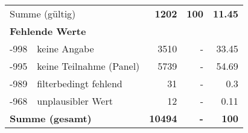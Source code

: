 \begin{longtable}{lXrrr}
     \midrule
     \multicolumn{2}{l}{Summe (gültig)} &
       \textbf{\num{1202}} &
     \textbf{100} &
       \textbf{\num[round-mode=places,round-precision=2]{11,45}} \\
     \multicolumn{5}{l}{\textbf{Fehlende Werte}}\\
       -998 &
       keine Angabe &
         \num{3510} &
        - &
         \num[round-mode=places,round-precision=2]{33,45} \\
       -995 &
       keine Teilnahme (Panel) &
         \num{5739} &
        - &
         \num[round-mode=places,round-precision=2]{54,69} \\
       -989 &
       filterbedingt fehlend &
         \num{31} &
        - &
         \num[round-mode=places,round-precision=2]{0,3} \\
       -968 &
       unplausibler Wert &
         \num{12} &
        - &
         \num[round-mode=places,round-precision=2]{0,11} \\
     \midrule
     \multicolumn{2}{l}{\textbf{Summe (gesamt)}} &
          \textbf{\num{10494}} &
        \textbf{-} &
        \textbf{100} \\
     \bottomrule
     \end{longtable}
     
